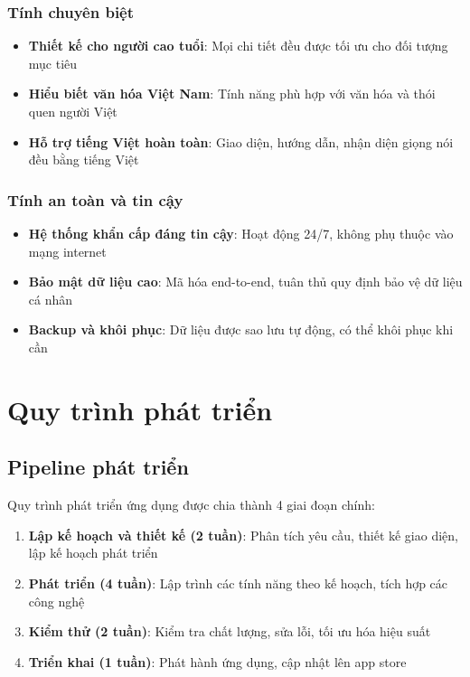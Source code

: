 \documentclass[12pt,a4paper]{article}
\begin{document}
\subsubsection{Tính chuyên biệt}
\begin{itemize}[leftmargin=2cm]
    \item \textbf{Thiết kế cho người cao tuổi}: Mọi chi tiết đều được tối ưu cho đối tượng mục tiêu
    \item \textbf{Hiểu biết văn hóa Việt Nam}: Tính năng phù hợp với văn hóa và thói quen người Việt
    \item \textbf{Hỗ trợ tiếng Việt hoàn toàn}: Giao diện, hướng dẫn, nhận diện giọng nói đều bằng tiếng Việt
\end{itemize}

\subsubsection{Tính an toàn và tin cậy}
\begin{itemize}[leftmargin=2cm]
    \item \textbf{Hệ thống khẩn cấp đáng tin cậy}: Hoạt động 24/7, không phụ thuộc vào mạng internet
    \item \textbf{Bảo mật dữ liệu cao}: Mã hóa end-to-end, tuân thủ quy định bảo vệ dữ liệu cá nhân
    \item \textbf{Backup và khôi phục}: Dữ liệu được sao lưu tự động, có thể khôi phục khi cần
\end{itemize}

\section{Quy trình phát triển}

\subsection{Pipeline phát triển}
Quy trình phát triển ứng dụng được chia thành 4 giai đoạn chính:

\begin{enumerate}[leftmargin=2cm]
    \item \textbf{Lập kế hoạch và thiết kế (2 tuần)}: Phân tích yêu cầu, thiết kế giao diện, lập kế hoạch phát triển
    \item \textbf{Phát triển (4 tuần)}: Lập trình các tính năng theo kế hoạch, tích hợp các công nghệ
    \item \textbf{Kiểm thử (2 tuần)}: Kiểm tra chất lượng, sửa lỗi, tối ưu hóa hiệu suất
    \item \textbf{Triển khai (1 tuần)}: Phát hành ứng dụng, cập nhật lên app store
\end{enumerate}
\end{document}
